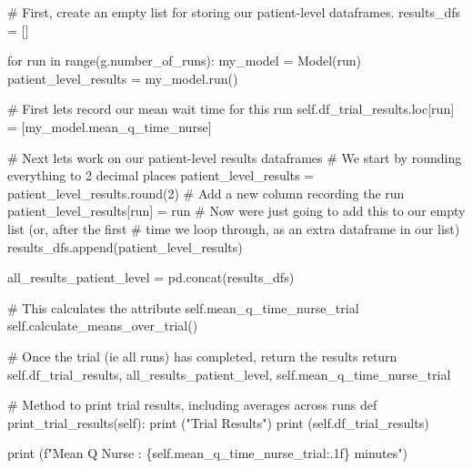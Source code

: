 \documentclass[
  letterpaper,
  DIV=11,
  numbers=noendperiod]{scrreprt}
\newenvironment{Shaded}{}{}
\newcommand{\BuiltInTok}[1]{\textcolor[rgb]{0.84,0.23,0.29}{#1}}
\newcommand{\CommentTok}[1]{\textcolor[rgb]{0.42,0.45,0.49}{#1}}
\newcommand{\ControlFlowTok}[1]{\textcolor[rgb]{0.84,0.23,0.29}{#1}}
\newcommand{\DecValTok}[1]{\textcolor[rgb]{0.00,0.36,0.77}{#1}}
\newcommand{\KeywordTok}[1]{\textcolor[rgb]{0.84,0.23,0.29}{#1}}
\newcommand{\NormalTok}[1]{\textcolor[rgb]{0.14,0.16,0.18}{#1}}
\newcommand{\OperatorTok}[1]{\textcolor[rgb]{0.14,0.16,0.18}{#1}}
\newcommand{\SpecialCharTok}[1]{\textcolor[rgb]{0.00,0.36,0.77}{#1}}
\newcommand{\SpecialStringTok}[1]{\textcolor[rgb]{0.01,0.18,0.38}{#1}}
\newcommand{\StringTok}[1]{\textcolor[rgb]{0.01,0.18,0.38}{#1}}
\newcommand{\VariableTok}[1]{\textcolor[rgb]{0.89,0.38,0.04}{#1}}
\begin{document}
\begin{tcolorbox}
\begin{Shaded}
\begin{Highlighting}[]
        \CommentTok{\# First, create an empty list for storing our patient{-}level dataframes.}
\NormalTok{        results\_dfs }\OperatorTok{=}\NormalTok{ []}

        \ControlFlowTok{for}\NormalTok{ run }\KeywordTok{in} \BuiltInTok{range}\NormalTok{(g.number\_of\_runs):}
\NormalTok{            my\_model }\OperatorTok{=}\NormalTok{ Model(run)}
\NormalTok{            patient\_level\_results }\OperatorTok{=}\NormalTok{ my\_model.run()}

            \CommentTok{\# First let\textquotesingle{}s record our mean wait time for this run}
            \VariableTok{self}\NormalTok{.df\_trial\_results.loc[run] }\OperatorTok{=}\NormalTok{ [my\_model.mean\_q\_time\_nurse]}

            \CommentTok{\# Next let\textquotesingle{}s work on our patient{-}level results dataframes}
            \CommentTok{\# We start by rounding everything to 2 decimal places}
\NormalTok{            patient\_level\_results }\OperatorTok{=}\NormalTok{ patient\_level\_results.}\BuiltInTok{round}\NormalTok{(}\DecValTok{2}\NormalTok{)}
            \CommentTok{\# Add a new column recording the run}
\NormalTok{            patient\_level\_results[}\StringTok{\textquotesingle{}run\textquotesingle{}}\NormalTok{] }\OperatorTok{=}\NormalTok{ run}
            \CommentTok{\# Now we\textquotesingle{}re just going to add this to our empty list (or, after the first}
            \CommentTok{\# time we loop through, as an extra dataframe in our list)}
\NormalTok{            results\_dfs.append(patient\_level\_results)}

\NormalTok{        all\_results\_patient\_level }\OperatorTok{=}\NormalTok{ pd.concat(results\_dfs)}

        \CommentTok{\# This calculates the attribute self.mean\_q\_time\_nurse\_trial}
        \VariableTok{self}\NormalTok{.calculate\_means\_over\_trial()}

        \CommentTok{\# Once the trial (ie all runs) has completed, return the results}
        \ControlFlowTok{return} \VariableTok{self}\NormalTok{.df\_trial\_results, all\_results\_patient\_level, }\VariableTok{self}\NormalTok{.mean\_q\_time\_nurse\_trial}

    \CommentTok{\# Method to print trial results, including averages across runs}
    \KeywordTok{def}\NormalTok{ print\_trial\_results(}\VariableTok{self}\NormalTok{):}
        \BuiltInTok{print}\NormalTok{ (}\StringTok{"Trial Results"}\NormalTok{)}
        \BuiltInTok{print}\NormalTok{ (}\VariableTok{self}\NormalTok{.df\_trial\_results)}

        \BuiltInTok{print}\NormalTok{ (}\SpecialStringTok{f"Mean Q Nurse : }\SpecialCharTok{\{}\VariableTok{self}\SpecialCharTok{.}\NormalTok{mean\_q\_time\_nurse\_trial}\SpecialCharTok{:.1f\}}\SpecialStringTok{ minutes"}\NormalTok{)}
\end{Highlighting}
\end{Shaded}

\end{tcolorbox}
\end{document}
